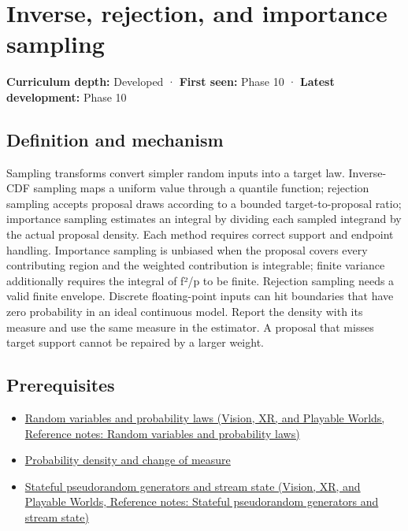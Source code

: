 \hypertarget{appendix-8d863ed954d0}{}\label{referencestart:appendix-8d863ed954d0}
\section{Inverse, rejection, and importance sampling}\label{appendix-8d863ed954d0-inverse-rejection-and-importance-sampling}

\textbf{Curriculum depth:} Developed · \textbf{First seen:} Phase 10 · \textbf{Latest development:} Phase 10

\begin{allmightroledefinition}

\subsection{Definition and mechanism}\label{appendix-8d863ed954d0-definition-and-mechanism}

Sampling transforms convert simpler random inputs into a target law. Inverse-CDF sampling maps a uniform value through a quantile function; rejection sampling accepts proposal draws according to a bounded target-to-proposal ratio; importance sampling estimates an integral by dividing each sampled integrand by the actual proposal density. Each method requires correct support and endpoint handling. Importance sampling is unbiased when the proposal covers every contributing region and the weighted contribution is integrable; finite variance additionally requires the integral of f²/p to be finite. Rejection sampling needs a valid finite envelope. Discrete floating-point inputs can hit boundaries that have zero probability in an ideal continuous model. Report the density with its measure and use the same measure in the estimator. A proposal that misses target support cannot be repaired by a larger weight.

\end{allmightroledefinition}

\subsection{Prerequisites}\label{appendix-8d863ed954d0-prerequisites}

\begin{itemize}
\tightlist
\item
  \href{../07-Vision-XR-and-Playable-Worlds/main.pdf\#nameddest=appendix-4d0203f7944f}{Random variables and probability laws (Vision, XR, and Playable Worlds, Reference notes: Random variables and probability laws)}
\item
  \hyperref[appendix-4815cd87ab8b]{Probability density and change of measure}
\item
  \href{../07-Vision-XR-and-Playable-Worlds/main.pdf\#nameddest=appendix-e0f7c7e08f3a}{Stateful pseudorandom generators and stream state (Vision, XR, and Playable Worlds, Reference notes: Stateful pseudorandom generators and stream state)}
\end{itemize}

